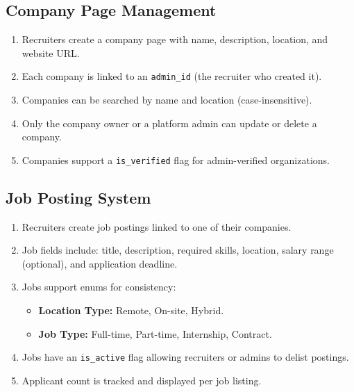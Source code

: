 \documentclass[12pt,a4paper]{article}
\begin{document}
\subsection{Company Page Management}
\begin{enumerate}
  \item Recruiters create a company page with name, description, location, and website URL.
  \item Each company is linked to an \texttt{admin\_id} (the recruiter who created it).
  \item Companies can be searched by name and location (case-insensitive).
  \item Only the company owner or a platform admin can update or delete a company.
  \item Companies support a \texttt{is\_verified} flag for admin-verified organizations.
\end{enumerate}

\subsection{Job Posting System}
\begin{enumerate}
  \item Recruiters create job postings linked to one of their companies.
  \item Job fields include: title, description, required skills, location, salary range (optional), and application deadline.
  \item Jobs support enums for consistency:
    \begin{itemize}
      \item \textbf{Location Type:} Remote, On-site, Hybrid.
      \item \textbf{Job Type:} Full-time, Part-time, Internship, Contract.
    \end{itemize}
  \item Jobs have an \texttt{is\_active} flag allowing recruiters or admins to delist postings.
  \item Applicant count is tracked and displayed per job listing.
\end{enumerate}
\end{document}
